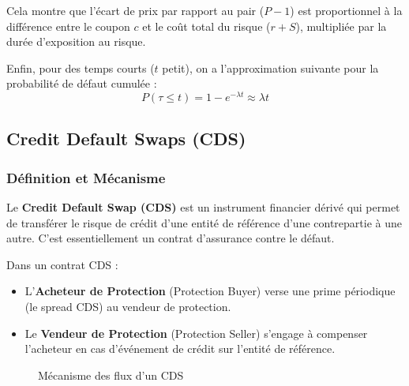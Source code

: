Cela montre que l'écart de prix par rapport au pair ($P-1$) est proportionnel à la différence entre le coupon $c$ et le coût total du risque ($r+S$), multipliée par la durée d'exposition au risque.

Enfin, pour des temps courts ($t$ petit), on a l'approximation suivante pour la probabilité de défaut cumulée :
\begin{equation}
    P(\tau \le t) = 1 - e^{-\lambda t} \approx \lambda t
\end{equation}

\subsection{Credit Default Swaps (CDS)}

\subsubsection{Définition et Mécanisme}

Le \textbf{Credit Default Swap (CDS)} est un instrument financier dérivé qui permet de transférer le risque de crédit d'une entité de référence d'une contrepartie à une autre. C'est essentiellement un contrat d'assurance contre le défaut.

Dans un contrat CDS :
\begin{itemize}
    \item L'\textbf{Acheteur de Protection} (Protection Buyer) verse une prime périodique (le spread CDS) au vendeur de protection.
    \item Le \textbf{Vendeur de Protection} (Protection Seller) s'engage à compenser l'acheteur en cas d'événement de crédit sur l'entité de référence.
\end{itemize}

\begin{figure}[H]
    \centering
    \caption{Mécanisme des flux d'un CDS}
    \label{fig:cds_flows}
\end{figure}


